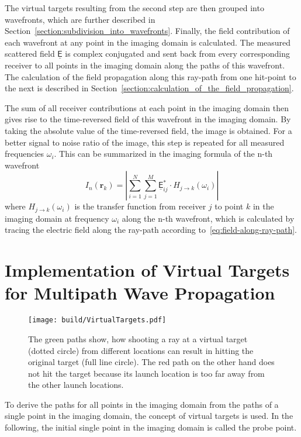 The virtual targets resulting from the second step are then grouped into wavefronts, which are further described in Section~\ref{section:subdivision_into_wavefronts}.
Finally, the field contribution of each wavefront at any point in the imaging domain is calculated.
The measured scattered field \(\underline{\mathsf{E}}\) is complex conjugated and sent back from every corresponding receiver to all points in the imaging domain along the paths of this wavefront.
The calculation of the field propagation along this ray-path from one hit-point to the next is described in Section~\ref{section:calculation_of_the_field_propagation}.

The sum of all receiver contributions at each point in the imaging domain then gives rise to the time-reversed field of this wavefront in the imaging domain.
By taking the absolute value of the time-reversed field, the image is obtained.
For a better signal to noise ratio of the image, this step is repeated for all measured frequencies \(\omega_i\).
This can be summarized in the imaging formula of the n-th wavefront
\begin{equation}
    I_n(\bm{r}_k) = |\sum_{i=1}^{N} \sum_{j=1}^{M} \underline{\mathsf{E}}_{ij}^* \cdot H_{j \rightarrow k}(\omega_i)|
\end{equation}
where \(H_{j \rightarrow k}(\omega_i)\) is the transfer function from receiver \(j\) to point \(k\) in the imaging domain at frequency \(\omega_i\) along the n-th wavefront, which is calculated by tracing the electric field along the ray-path according to~\eqref{eq:field-along-ray-path}.


\section{Implementation of Virtual Targets for Multipath Wave Propagation}\label{section:virtual_targets}

\begin{figure}[ht]
    \centering
    \texttt{[image: build/VirtualTargets.pdf]}
    \caption{The green paths show, how shooting a ray at a virtual target (dotted circle) from different locations can result in hitting the original target (full line circle). The red path on the other hand does not hit the target because its launch location is too far away from the other launch locations.}\label{fig:virtual_targets}
\end{figure}

To derive the paths for all points in the imaging domain from the paths of a single point in the imaging domain, the concept of virtual targets is used.
In the following, the initial single point in the imaging domain is called the probe point.

